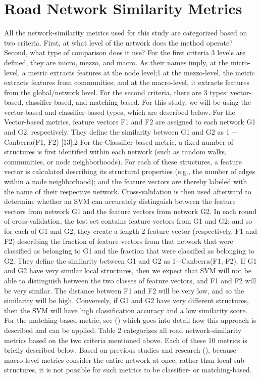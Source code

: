 \section{Road Network Similarity Metrics}
All the network-similarity metrics used for this study are categorized based on two criteria. First, at what level of the network does the method operate? Second, what type of comparison does it use? For the first criteria 3 levels are defined, they are micro, mezzo, and macro. As their names imply, at the micro-level, a metric extracts features at the node level;1 at the mezzo-level, the metric extracts features from communities; and at the macro-level, it extracts features from the global/network level.  For the second criteria, there are 3 types: vector-based, classifier-based, and matching-based. For this study, we will be using the vector-based and classifier-based types, which are described below. For the Vector-based metrics, feature vectors F1 and F2 are assigned to each network G1 and G2, respectively. They define the similarity between G1 and G2 as 1 − Canberra(F1, F2) [13].2 For the Classifier-based metric,  a fixed number of structures is first identified within each network (such as random walks, communities, or node neighborhoods). For each of these structures, a feature vector is calculated describing its structural properties (e.g., the number of edges within a node neighborhood); and the feature vectors are thereby labeled with the name of their respective network. Cross-validation is then used afterward to determine whether an SVM can accurately distinguish between the feature vectors from network G1 and the feature vectors from network G2. In each round of cross-validation, the test set contains feature vectors from G1 and G2; and so for each of G1 and G2, they create a length-2 feature vector (respectively, F1 and F2) describing the fraction of feature vectors from that network that were classified as belonging to G1 and the fraction that were classified as belonging to G2. They define the similarity between G1 and G2 as 1−Canberra(F1, F2). If G1 and G2 have very similar local structures, then we expect that SVM will not be able to distinguish between the two classes of feature vectors, and F1 and F2 will be very similar. The distance between F1 and F2 will be very low, and so the similarity will be high. Conversely, if G1 and G2 have very different structures, then the SVM will have high classification accuracy and a low similarity score. For the matching-based metric, see () which goes into detail how this approach is described and can be applied. Table 2 categorizes all road network-similarity metrics
based on the two criteria mentioned above. Each of these 10 metrics is briefly described below. Based on previous studies and research (), because macro-level metrics consider the entire network at once, rather than local sub-structures, it is not possible for such metrics to be classifier- or matching-based.

